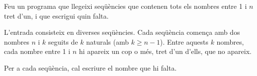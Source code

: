 
\Statement

Feu un programa que llegeixi seqüències
que contenen tots els nombres entre 1 i $n$ tret d'un,
i que escrigui quin falta. 

\Input

L'entrada consisteix en diverses seqüències.
Cada seqüència comença amb dos nombres $n$ i $k$
seguits de $k$ naturals (amb $k\ge n-1$). Entre aquests $k$ nombres, cada nombre entre 1 i $n$ hi apareix un cop o més,
tret d'un d'ells, que no apareix.

\Output

Per a cada seqüència, cal escriure el nombre que hi falta.

\Sample
